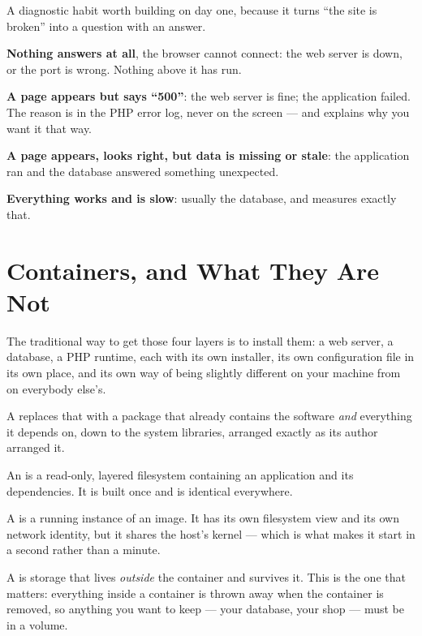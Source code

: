 \begin{conceptbox}
A diagnostic habit worth building on day one, because it turns ``the site is
broken'' into a question with an answer.

\begin{tight}
  \item \textbf{Nothing answers at all}, the browser cannot connect: the web
        server is down, or the port is wrong. Nothing above it has run.
  \item \textbf{A page appears but says ``500''}: the web server is fine; the
        application failed. The reason is in the PHP error log, never on the
        screen --- and  explains why you want it that way.
  \item \textbf{A page appears, looks right, but data is missing or stale}: the
        application ran and the database answered something unexpected.
  \item \textbf{Everything works and is slow}: usually the database, and
         measures exactly that.
\end{tight}
\end{conceptbox}

\section{Containers, and What They Are Not}

The traditional way to get those four layers is to install them: a web server, a
database, a PHP runtime, each with its own installer, its own configuration
file in its own place, and its own way of being slightly different on your
machine from on everybody else's.

A  replaces that with a package that already contains the
software \emph{and} everything it depends on, down to the system libraries,
arranged exactly as its author arranged it.

\begin{definitionbox}
An  is a read-only, layered filesystem containing an application
and its dependencies. It is built once and is identical everywhere.

\smallskip
A  is a running instance of an image. It has its own filesystem
view and its own network identity, but it shares the host's kernel --- which is
what makes it start in a second rather than a minute.

\smallskip
A  is storage that lives \emph{outside} the container and survives
it. This is the one that matters: everything inside a container is thrown away
when the container is removed, so anything you want to keep --- your database,
your shop --- must be in a volume.
\end{definitionbox}

